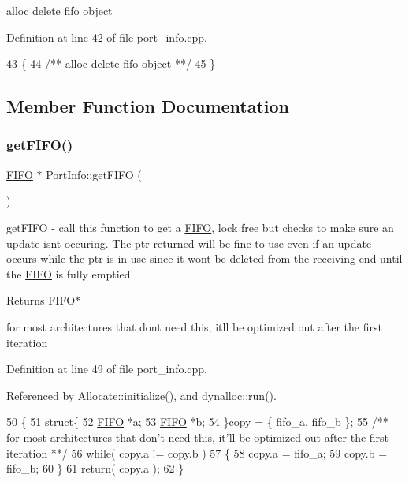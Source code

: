 alloc delete fifo object 

Definition at line 42 of file port\+\_\+info.\+cpp.


\begin{DoxyCode}
43 \{\textcolor{comment}{}
44 \textcolor{comment}{   /** alloc delete fifo object **/}
45 \}
\end{DoxyCode}


\subsection{Member Function Documentation}
\hypertarget{struct_port_info_a483d162fbe356e07381c6c5cfccb4f48}{}\label{struct_port_info_a483d162fbe356e07381c6c5cfccb4f48} 
\subsubsection{\texorpdfstring{get\+F\+I\+F\+O()}{getFIFO()}}
{\footnotesize\ttfamily \hyperlink{class_f_i_f_o}{F\+I\+FO} $\ast$ Port\+Info\+::get\+F\+I\+FO (\begin{DoxyParamCaption}{ }\end{DoxyParamCaption})}

get\+F\+I\+FO -\/ call this function to get a \hyperlink{class_f_i_f_o}{F\+I\+FO}, lock free but checks to make sure an update isn\textquotesingle{}t occuring. The ptr returned will be fine to use even if an update occurs while the ptr is in use since it won\textquotesingle{}t be deleted from the receiving end until the \hyperlink{class_f_i_f_o}{F\+I\+FO} is fully emptied. \begin{DoxyReturn}{Returns}
F\+I\+F\+O$\ast$ 
\end{DoxyReturn}
for most architectures that don\textquotesingle{}t need this, it\textquotesingle{}ll be optimized out after the first iteration 

Definition at line 49 of file port\+\_\+info.\+cpp.



Referenced by Allocate\+::initialize(), and dynalloc\+::run().


\begin{DoxyCode}
50 \{
51    \textcolor{keyword}{struct}\{
52       \hyperlink{class_f_i_f_o}{FIFO} *a;
53       \hyperlink{class_f_i_f_o}{FIFO} *b;
54    \}copy = \{ fifo\_a, fifo\_b \};\textcolor{comment}{}
55 \textcolor{comment}{   /** for most architectures that don't need this, it'll be optimized out after the first iteration **/}
56    \textcolor{keywordflow}{while}( copy.a != copy.b )
57    \{
58       copy.a = fifo\_a;
59       copy.b = fifo\_b;
60    \}
61    \textcolor{keywordflow}{return}( copy.a );
62 \}
\end{DoxyCode}
\hypertarget{struct_port_info_a43a57cd624dcc44ccd9dcaba1d07a000}{}\label{struct_port_info_a43a57cd624dcc44ccd9dcaba1d07a000} 
